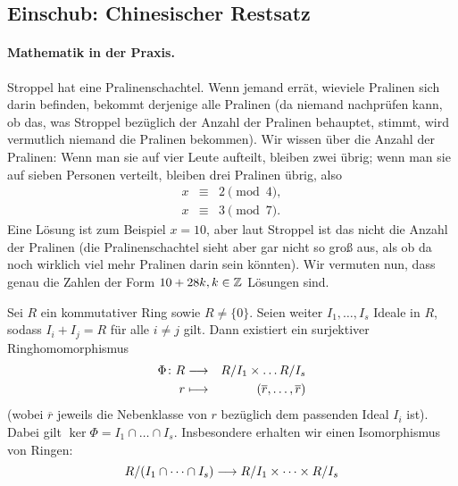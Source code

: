 \documentclass[12pt,a4paper]{scrartcl}
\begin{document}
\subsection{Einschub: Chinesischer Restsatz}
\paragraph{Mathematik in der Praxis.}
Stroppel hat eine Pralinenschachtel. Wenn jemand errät, wieviele Pralinen sich darin befinden, bekommt derjenige alle Pralinen (da niemand nachprüfen kann, ob das, was Stroppel bezüglich der Anzahl der Pralinen behauptet, stimmt, wird vermutlich niemand die Pralinen bekommen). Wir wissen über die Anzahl der Pralinen: Wenn man sie auf vier Leute aufteilt, bleiben zwei übrig; wenn man sie auf sieben Personen verteilt, bleiben drei Pralinen übrig, also
\begin{eqnarray*}
	x &\equiv & 2 \pmod 4,\\
	x &\equiv & 3 \pmod 7.
\end{eqnarray*}
Eine Lösung ist zum Beispiel $x = 10$, aber laut Stroppel ist das nicht die Anzahl der Pralinen (die Pralinenschachtel sieht aber gar nicht so groß aus, als ob da noch wirklich viel mehr Pralinen darin sein könnten). Wir vermuten nun, dass genau die Zahlen der Form $10+28k, k\in\mathbb Z$ Lösungen sind.

\begin{satz}
	Sei $R$ ein kommutativer Ring sowie $R\neq\{0\}$. Seien weiter $I_1,\dots,I_s$ Ideale in $R$, sodass $I_i+I_j = R$ für alle $i\neq j$ gilt. Dann existiert ein surjektiver Ringhomomorphismus
	\begin{eqnarray*}
		\Phi\colon R & \longrightarrow & R/I_1\times \dots R/I_s\\
		r & \longmapsto & (\overline{r},\dots, \overline{r})
	\end{eqnarray*}
	(wobei $\overline{r}$ jeweils die Nebenklasse von $r$ bezüglich dem passenden Ideal $I_i$ ist).
	Dabei gilt $\ker\Phi = I_1\cap\dots\cap I_s$. Insbesondere erhalten wir einen Isomorphismus von Ringen:
	$$ R/(I_1\cap\dots\cap I_s) \longrightarrow R/I_1 \times\dots \times R/I_s$$
	
\end{satz}
\end{document}
